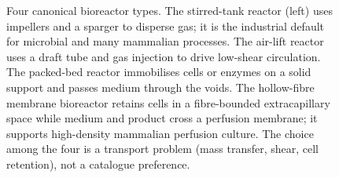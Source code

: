 \begin{figure}[htbp]
\caption{Four canonical bioreactor types. The stirred-tank reactor (left) uses impellers and a sparger to disperse gas; it is the industrial default for microbial and many mammalian processes. The air-lift reactor uses a draft tube and gas injection to drive low-shear circulation. The packed-bed reactor immobilises cells or enzymes on a solid support and passes medium through the voids. The hollow-fibre membrane bioreactor retains cells in a fibre-bounded extracapillary space while medium and product cross a perfusion membrane; it supports high-density mammalian perfusion culture. The choice among the four is a transport problem (mass transfer, shear, cell retention), not a catalogue preference.}
\label{fig:vol06ch10:bioreactor-types}
\end{figure}
